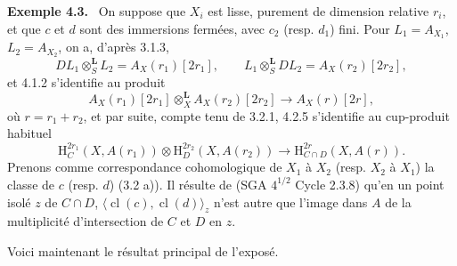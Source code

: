 \documentclass[11pt]{article}
\newenvironment{statement}[1]{\par\medskip\noindent\textbf{#1.}\ }{\par\medskip}
\renewcommand{\H}{\mathrm{H}}
\providecommand{\cl}{\operatorname{cl}}
\begin{document}
\begin{statement}{Exemple 4.3}
On suppose que $X_i$ est lisse, purement de dimension relative $r_i$, et que $c$ et $d$ sont des immersions fermées, avec $c_2$ (resp. $d_1$) fini. Pour $L_1=A_{X_1}$, $L_2=A_{X_2}$, on a, d'après 3.1.3,
\[
DL_1\otimes_S^{\mathbf L}L_2=A_X(r_1)[2r_1],\qquad
L_1\otimes_S^{\mathbf L}DL_2=A_X(r_2)[2r_2],
\]
et 4.1.2 s'identifie au produit
\[
A_X(r_1)[2r_1]\otimes_X^{\mathbf L}A_X(r_2)[2r_2]\longrightarrow A_X(r)[2r],
\]
où $r=r_1+r_2$, et par suite, compte tenu de 3.2.1, 4.2.5 s'identifie au cup-produit habituel
\[
\H_C^{2r_1}(X,A(r_1))\otimes \H_D^{2r_2}(X,A(r_2))
\longrightarrow
\H_{C\cap D}^{2r}(X,A(r)).
\]
Prenons comme correspondance cohomologique de $X_1$ à $X_2$ (resp. $X_2$ à $X_1$) la classe de $c$ (resp. $d$) (3.2 a)). Il résulte de (SGA $4^{1/2}$ Cycle 2.3.8) qu'en un point isolé $z$ de $C\cap D$, $\langle \cl(c),\cl(d)\rangle_z$ n'est autre que l'image dans $A$ de la multiplicité d'intersection de $C$ et $D$ en $z$.
\end{statement}

Voici maintenant le résultat principal de l'exposé.
\end{document}
